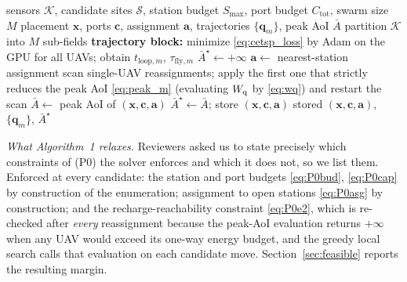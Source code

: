 \begin{algorithm}[t]
\caption{Block-coordinate joint solver for (P0)}
\label{alg:solver}
\begin{algorithmic}[1]
\REQUIRE sensors $\mathcal{K}$, candidate sites $\mathcal{S}$, station budget
  $S_{\max}$, port budget $C_{\mathrm{tot}}$, swarm size $M$
\ENSURE placement $\mathbf{x}$, ports $\mathbf{c}$, assignment $\mathbf{a}$,
  trajectories $\{\mathbf{q}_m\}$, peak AoI $\bar{A}$
\STATE partition $\mathcal{K}$ into $M$ sub-fields
\STATE \textbf{trajectory block:} minimize \eqref{eq:cetsp_loss} by Adam on the
  GPU for all UAVs; obtain $t_{\mathrm{loop},m}$, $\tau_{\mathrm{fly},m}$
\STATE $\bar{A}^\star \gets +\infty$
    \STATE $\mathbf{a}\gets$ nearest-station assignment
    \REPEAT
      \STATE scan single-UAV reassignments; apply the first one that strictly
        reduces the peak AoI \eqref{eq:peak_m} (evaluating $W_{\mathrm q}$ by \eqref{eq:wq})
        and restart the scan
    \STATE $\bar{A}\gets$ peak AoI of $(\mathbf{x},\mathbf{c},\mathbf{a})$
      \STATE $\bar{A}^\star\gets\bar{A}$; store $(\mathbf{x},\mathbf{c},\mathbf{a})$
    \ENDIF
  \ENDFOR
\ENDFOR
\RETURN stored $(\mathbf{x},\mathbf{c},\mathbf{a})$, $\{\mathbf{q}_m\}$, $\bar{A}^\star$
\end{algorithmic}
\end{algorithm}

\emph{What Algorithm~1 relaxes.} Reviewers asked us to state precisely which
constraints of (P0) the solver enforces and which it does not, so we list them.
Enforced at every candidate: the station and port budgets \eqref{eq:P0bud},
\eqref{eq:P0cap} by construction of the enumeration; assignment to open stations
\eqref{eq:P0asg} by construction; and the recharge-reachability constraint
\eqref{eq:P0e2}, which is re-checked after \emph{every} reassignment because the
peak-AoI evaluation returns $+\infty$ when any UAV would exceed its one-way energy
budget, and the greedy local search calls that evaluation on each candidate move.
Section~\ref{sec:feasible} reports the resulting margin.

